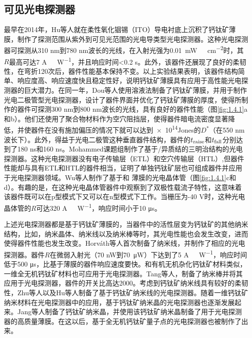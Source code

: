 \documentclass[forlib]{WHUMaster}   %
\begin{document}
{\subsection{可见光电探测器}

最早在2014年，Hu等人就在柔性氧化铟锡（ITO）导电衬底上沉积了钙钛矿薄膜，制作了探测范围从紫外到可见光范围的光电导类型光电探测器\cite{RN122}。这种光电探测器可探测从310 nm到780 nm波长的光线，在入射光强为0.01\ \si{mW \ cm^{-2}}时，其$R$最高可达7 \si{A\ W^{-1}}，并且响应时间<0.2 s。此外，该器件还展现了良好的柔韧性，在弯折120次后，器件性能基本保持不变。以上实验结果表明，该器件结构简单、响应度高、响应速度快且稳定性好，说明钙钛矿薄膜具有应用于高性能光电探测器的巨大潜力。在同一年，Dou等人使用溶液法制备了钙钛矿薄膜，并用于制作光电二极管型光电探测器，设计了器件界面并优化了钙钛矿薄膜的厚度，使得所制作的器件可探测300 nm到800 nm波长的光线，具有良好的器件性能（图\ref{fig:1.4.1}a和b）\cite{RN129}。他们还使用了聚合物材料作为空穴阻挡层，使得器件暗电流密度显著降低，并使器件在没有施加偏压的情况下就可以达到\num{e14}Jones的$D^*$（在550 nm波长下）。此外，得益于光电二极管这种垂直器件结构，器件的$t_{\rm{raise}}$和$t_{\rm{fall}}$分别达到了180 ns和160 ns。Mohammed课题组制作了基于/异质结的三明治结构的光电探测器。\cite{RN138}这种光电探测器没有电子传输层（ETL）和空穴传输层（HTL）,但器件性能却与具有ETL和HTL的器件相当，证明了单独钙钛矿层也可组成器件并应用于光电探测器领域。Wu等人制作了基于和
薄膜的光电晶体管（图\ref{fig:1.4.1}c和d）\cite{RN139}。有趣的是，在这种光电晶体管器件中观察到了双极性载流子特性，这意味着该器件既可以在p型模式下又可以在n型模式下工作。当栅压为-40 V时，这种光电晶体管的$R$可达320 \si{A\ W^{-1}}，响应时间小于10 μs。

上述光电探测器都是基于钙钛矿薄膜的，当器件中的活性层变为钙钛矿的其他纳米结构，比如，纳米晶体、纳米线以及纳米棒等时，其光电性能也会发生改变，进而使得器件性能也发生改变。Horváth等人首次制备了纳米线，并制作了相应的光电探测器\cite{RN140}。器件$R$在微弱入射光（70 nW到70\ μW）下达到了5 \si{A\ W^{-1}}，响应时间低于500 μs，比基于薄膜的器件响应速度要快。和有机无机杂化钙钛矿材料类似，一维全无机钙钛矿材料也可应用于光电探测器。Tang等人，制备了纳米棒并将其应用于光电探测器，器件的开关比高达2000\cite{RN141}。考虑到钙钛矿纳米线具有较好的柔韧性，Zhu等人以及Hu等人制备了基于钙钛矿纳米线的光电探测器\cite{RN142,RN143}。随着一维钙钛矿纳米材料在光电探测器中的应用，基于钙钛矿纳米晶的光电探测器也逐渐发展起来。Jang等人制备了钙钛矿纳米晶，并使用该钙钛矿纳米晶制备了用于光电探测器的高质量薄膜\cite{RN61}。在这以后，基于全无机钙钛矿量子点的光电探测器也被制作了出来\cite{RN144}。

}
\end{document}
